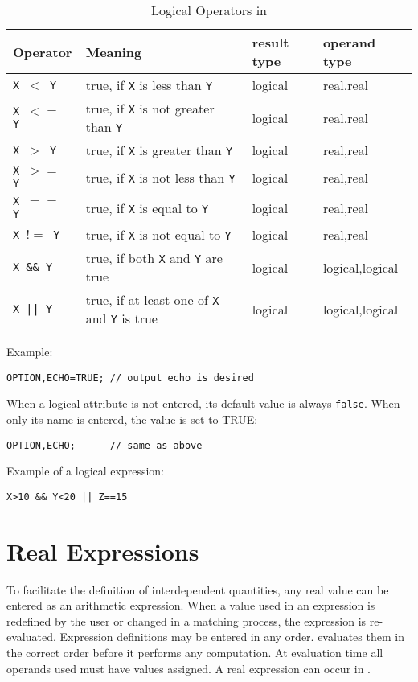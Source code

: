 \begin{table}[ht] \footnotesize
  \begin{center}
    \caption{Logical Operators in \opal}
    \label{tab:logoperator}
    \begin{tabular}{|l|p{}|l|l|}
      \hline
      Operator & Meaning & result type & operand type \\
      \hline
      \texttt{X $<$ Y} & true, if \texttt{X} is less than \texttt{Y} &
      logical &real,real \\
      \texttt{X $<=$ Y} & true, if \texttt{X} is not greater than \texttt{Y} &
      logical &real,real \\
      \texttt{X $>$ Y} & true, if \texttt{X} is greater than \texttt{Y} &
      logical &real,real \\
      \texttt{X $>=$ Y} & true, if \texttt{X} is not less than \texttt{Y} &
      logical &real,real \\
      \texttt{X $==$ Y} & true, if \texttt{X} is equal to \texttt{Y} &
      logical &real,real \\
      \texttt{X $!=$ Y} & true, if \texttt{X} is not equal to \texttt{Y} &
      logical &real,real \\
      \texttt{X \&\& Y} & true, if both \texttt{X} and \texttt{Y} are true &
      logical &logical,logical \\
      \texttt{X || Y} &
      true, if at least one of \texttt{X} and \texttt{Y} is true &
      logical &logical,logical \\
      \hline
    \end{tabular}
  \end{center}
\end{table}
\par
\noindent Example:
\begin{verbatim}
OPTION,ECHO=TRUE; // output echo is desired
\end{verbatim}
When a logical attribute is not entered, 
its default value is always \texttt{false}.
When only its name is entered, the value is set to TRUE:
\begin{verbatim}
OPTION,ECHO;      // same as above
\end{verbatim}
\noindent Example of a logical expression:
\begin{verbatim}
X>10 && Y<20 || Z==15
\end{verbatim}

\section{Real Expressions}
\label{sec:areal}
To facilitate the definition of interdependent quantities,
any real value can be entered as an arithmetic expression.
When a value used in an expression is redefined by the user
or changed in a matching process,
the expression is re-evaluated.
Expression definitions may be entered in any order.
\opal evaluates them in the correct order before it performs
any computation.
At evaluation time all operands used must have values assigned.
A real expression can occur in .

